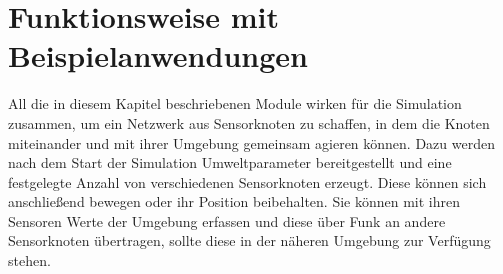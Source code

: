 \section{Funktionsweise mit Beispielanwendungen}

All die in diesem Kapitel beschriebenen Module wirken für die Simulation zusammen, um ein Netzwerk aus Sensorknoten zu schaffen, in dem die Knoten miteinander und mit ihrer Umgebung gemeinsam agieren können. Dazu werden nach dem Start der Simulation Umweltparameter bereitgestellt und eine festgelegte Anzahl von verschiedenen Sensorknoten erzeugt. Diese können sich anschließend bewegen oder ihr Position beibehalten. Sie können mit ihren Sensoren Werte der Umgebung erfassen und diese über Funk an andere Sensorknoten übertragen, sollte diese in der näheren Umgebung zur Verfügung stehen.
